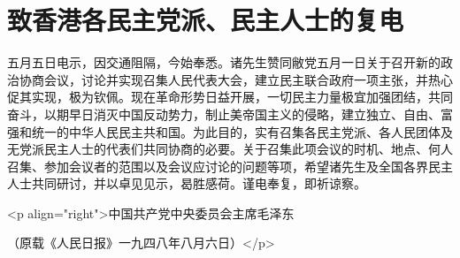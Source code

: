 \section[致香港各民主党派、民主人士的复电（一九四八年八月一日）]{致香港各民主党派、民主人士的复电}


五月五日电示，因交通阻隔，今始奉悉。诸先生赞同敝党五月一日关于召开新的政治协商会议，讨论并实现召集人民代表大会，建立民主联合政府一项主张，并热心促其实现，极为钦佩。现在革命形势日益开展，一切民主力量极宜加强团结，共同奋斗，以期早日消灭中国反动势力，制止美帝国主义的侵略，建立独立、自由、富强和统一的中华人民民主共和国。为此目的，实有召集各民主党派、各人民团体及无党派民主人士的代表们共同协商的必要。关于召集此项会议的时机、地点、何人召集、参加会议者的范围以及会议应讨论的问题等项，希望诸先生及全国各界民主人士共同研讨，并以卓见见示，曷胜感荷。谨电奉复，即祈谅察。

<p align="right">中国共产党中央委员会主席毛泽东

（原载《人民日报》一九四八年八月六日）</p>

